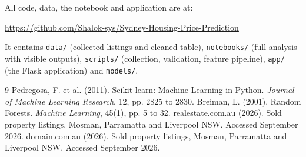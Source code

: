 \documentclass[11pt,a4paper]{article}
\begin{document}
All code, data, the notebook and application are at:

\begin{center}
\url{https://github.com/Shalok-sys/Sydney-Housing-Price-Prediction}
\end{center}

\noindent It contains \texttt{data/} (collected listings and cleaned
table), \texttt{notebooks/} (full analysis with visible outputs),
\texttt{scripts/} (collection, validation, feature pipeline),
\texttt{app/} (the Flask application) and \texttt{models/}.

\begin{thebibliography}{9}
\small
{} Pedregosa, F. et al. (2011). Scikit learn: Machine
Learning in Python. \textit{Journal of Machine Learning Research}, 12,
pp. 2825 to 2830.
 Breiman, L. (2001). Random Forests.
\textit{Machine Learning}, 45(1), pp. 5 to 32.
 realestate.com.au (2026). Sold property listings, Mosman,
Parramatta and Liverpool NSW. Accessed September 2026.
 domain.com.au (2026). Sold property listings, Mosman,
Parramatta and Liverpool NSW. Accessed September 2026.
\end{thebibliography}
\end{document}
